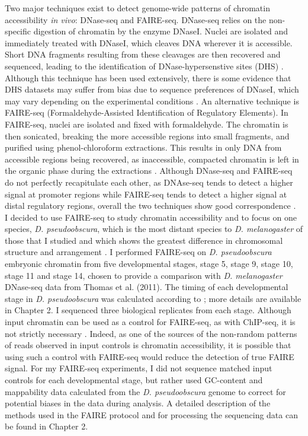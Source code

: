 Two major techniques exist to detect genome-wide patterns of chromatin accessibility \emph{in vivo}: DNase-seq and FAIRE-seq. DNase-seq relies on the non-specific digestion of chromatin by the enzyme DNaseI. Nuclei are isolated and immediately treated with DNaseI, which cleaves DNA wherever it is accessible. Short DNA fragments resulting from these cleavages are then recovered and sequenced, leading to the identification of DNase-hypersenstive sites (DHS) \citep{thomas_dynamic_2011}. Although this technique has been used extensively, there is some evidence that DHS datasets may suffer from bias due to sequence preferences of DNaseI, which may vary depending on the experimental conditions \citep{koohy_chromatin_2013}. An alternative technique is FAIRE-seq (Formaldehyde-Assisted Identification of Regulatory Elements). In FAIRE-seq, nuclei are isolated and fixed with formaldehyde. The chromatin is then sonicated, breaking the more accessible regions into small fragments, and purified using phenol-chloroform extractions. This results in only DNA from accessible regions being recovered, as inaccessible, compacted chromatin is left in the organic phase during the extractions \citep{giresi_isolation_2009, simon_using_2012}. Although DNase-seq and FAIRE-seq do not perfectly recapitulate each other, as DNAse-seq tends to detect a higher signal at promoter regions while FAIRE-seq tends to detect a higher signal at distal regulatory regions, overall the two techniques show good correspondence \citep{koohy_chromatin_2013, mckay_common_2013}.\\
   
I decided to use FAIRE-seq to study chromatin accessibility and to focus on one species, \emph{D. pseudoobscura}, which is the most distant species to \emph{D. melanogaster} of those that I studied and which shows the greatest difference in chromosomal structure and arrangement \citep{clark_evolution_2007,richards_comparative_2005}. I performed FAIRE-seq on \emph{D. pseudoobscura} embryonic chromatin from five developmental stages, stage 5, stage 9, stage 10, stage 11 and stage 14, chosen to provide a comparison with \emph{D. melanogaster} DNase-seq data from Thomas et al. (2011). The timing of each developmental stage in \emph{D. pseudoobscura} was calculated according to \citet{kuntz_native_2013}; more details are available in Chapter 2. I sequenced three biological replicates from each stage. Although input chromatin can be used as a control for FAIRE-seq, as with ChIP-seq, it is not strictly necessary \citep{simon_using_2012}. Indeed, as one of the sources of the non-random patterns of reads observed in input controls is chromatin accessibility, it is possible that using such a control with FAIRE-seq would reduce the detection of true FAIRE signal. For my FAIRE-seq experiments, I did not sequence matched input controls for each developmental stage, but rather used GC-content and mappability data calculated from the \emph{D. pseudoobscura} genome to correct for potential biases in the data during analysis. A detailed description of the methods used in the FAIRE protocol and for processing the sequencing data can be found in Chapter 2.

